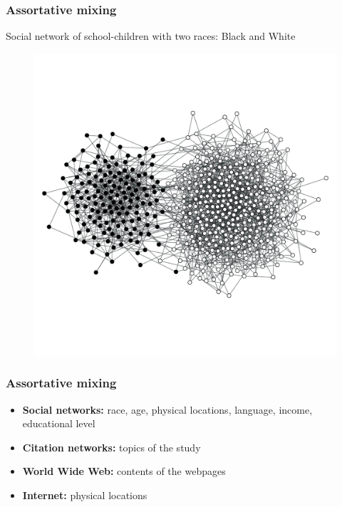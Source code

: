 \documentclass{beamer}
\begin{document}
\begin{frame}
    \frametitle{Assortative mixing}
    \pause
    \vspace{2em}
    \centering
    {\small Social network of school-children with two races: Black and White}
    \begin{figure}
        \begin{center}
        \includegraphics[width=0.8\columnwidth,trim=0 0 0 50,clip=true]{assort_network.pdf}
        \end{center}
    \end{figure}
\end{frame}
\begin{frame}
    \frametitle{Assortative mixing}
        \begin{itemize}
        \setlength\itemsep{1em}
            \item{{\bf Social networks:} race, age, physical locations, language, income, educational level}
            \item{{\bf Citation networks:} topics of the study}
            \item{{\bf World Wide Web:} contents of the webpages}
            \item{{\bf Internet:} physical locations}
        \end{itemize}
\end{frame}
\end{document}
